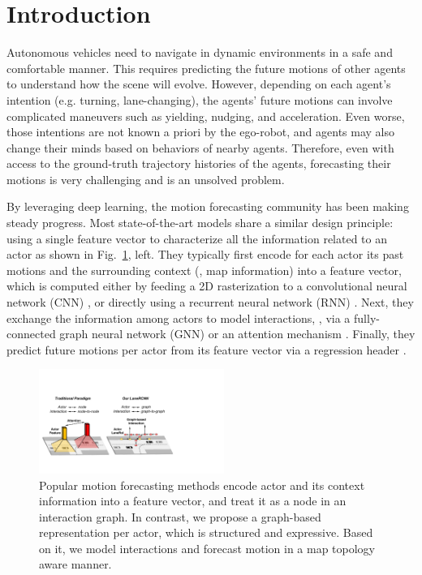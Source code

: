 \section{Introduction}
Autonomous vehicles need to navigate in dynamic environments in a safe and comfortable manner.  
This requires predicting the future motions of other agents to understand how the 
scene will evolve. 
However, depending on each agent's intention (e.g. turning, lane-changing), the agents' future motions can involve complicated maneuvers such as yielding, nudging, and acceleration.
Even worse, those intentions are not known a priori by the ego-robot, and agents may also change their minds based on behaviors of nearby agents. 
Therefore, even with access to the ground-truth trajectory histories of the agents,
forecasting their motions is very challenging and is an unsolved problem.

By leveraging deep learning, the motion forecasting community has been making steady progress. 
Most state-of-the-art models share a similar design principle: using a single feature
vector to characterize all the information related to an actor as shown in Fig.~\ref{fig:teaser}, left.
They typically first encode for each actor
its past motions and the surrounding context (\eg, map information) into a feature
vector, which is computed either by feeding a 2D rasterization to a
convolutional neural network (CNN)
\cite{nmp,dsd,precog,chauffeurnet,covernet,intentnet}, or directly using a
recurrent neural network (RNN)
\cite{matf,mfp,vectornet,tnt,sociallstm}.
Next, they exchange the information among actors to model interactions, \eg, via a fully-connected
graph neural network (GNN)
\cite{v2vnet,spagnn,precog,mfp,vectornet} or an attention
mechanism \cite{interacttransformer,sophie,socialatt,carnet,mercat2020multi}. 
Finally, they predict future motions per actor from its feature vector
via a regression header \cite{nmp,lgn,mfp,precog,pnpnet}.


\begin{figure}[t]
\begin{center}
  \includegraphics[height=3.4cm]{figures/teaser.pdf}
\end{center}
\vspace{-0.2cm}
\caption{Popular motion forecasting methods encode actor and its context
information into a feature vector, and treat it as a node in an interaction graph.
In contrast, we propose a graph-based
representation \ROI per actor, which is structured and expressive. Based on
it, we model interactions and forecast motion in a map topology aware manner.}
\label{fig:teaser}
\vspace{-0.2cm}
\end{figure}



